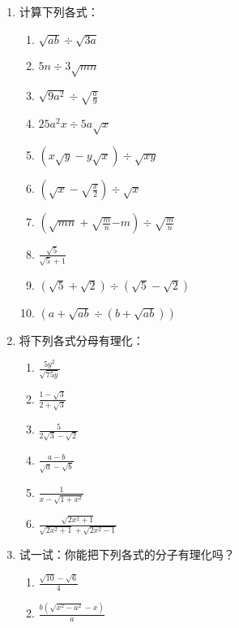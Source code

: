 \begin{ex}
\begin{enumerate}
    \item 计算下列各式：
\begin{multicols}{2}
\begin{enumerate}
    \item $\sqrt{ab}\div \sqrt{3a}$
    \item $5n\div 3\sqrt{mn}$
\item $\sqrt{9a^2}\div \sqrt{\frac{a}{9}}$
\item $25a^2x\div 5a\sqrt{x}$
\item  $\left(x\sqrt{y}-y\sqrt{x}\right)\div \sqrt{xy}$
\item $\left(\sqrt{x}-\sqrt{\frac{x}{2}}\right)\div \sqrt{x}$
\item $\left(\sqrt{mn}+\sqrt{\frac{m}{n}}{-m}\right)\div \sqrt{\frac{m}{n}}$
\item $\frac{\sqrt{5}}{\sqrt{5}+1}$
\item $(\sqrt{5}+\sqrt{2})\div (\sqrt{5}-\sqrt{2})$
\item $(a+\sqrt{ab}\div (b+\sqrt{ab}))$
\end{enumerate}    
\end{multicols}

    \item 将下列各式分母有理化：
    \begin{multicols}{2}
\begin{enumerate}
\item $\frac{5y^2}{\sqrt{75y}}$
\item $\frac{1-\sqrt{3}}{2+\sqrt{3}}$
\item $\frac{5}{2\sqrt{3}-\sqrt{2}}$
\item $\frac{a-b}{\sqrt{a}-\sqrt{b}}$
\item $\frac{1}{x-\sqrt{1+x^2}}$
\item $\frac{\sqrt{2x^2+1}}{\sqrt{2x^2+1}+\sqrt{2x^2-1}}$
\end{enumerate}    
\end{multicols}

    \item 试一试：你能把下列各式的分子有理化吗？
    \begin{multicols}{2}
        \begin{enumerate}
        \item  $\frac{\sqrt{10}-\sqrt{6}}{4}$
        \item $\frac{b(\sqrt{x^2-a^2}-x)}{a}$
        \end{enumerate}    
        \end{multicols}
\end{enumerate}    
\end{ex}

